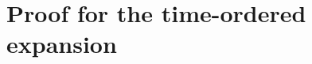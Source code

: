 \documentclass[twocolumn]{autart}    %
\newcommand{\Ic}{\mathcal{I}}
\newcommand{\Tb}{\mathbb{T}}
\begin{document}
\section{Proof for the time-ordered expansion}
\label{sec:thechnical_results:time_ordered}
\end{document}

